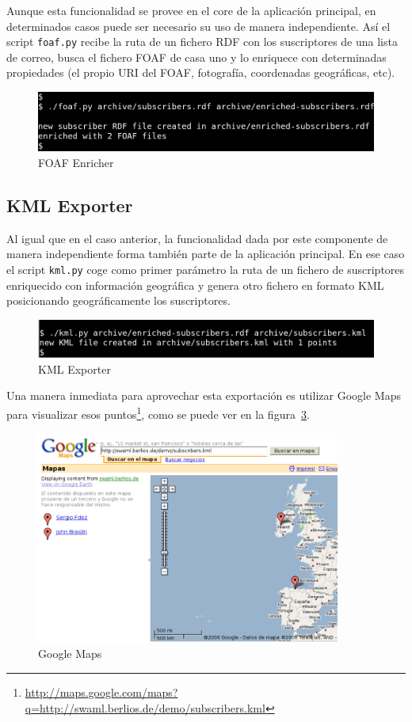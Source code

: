 Aunque esta funcionalidad se provee en el core de la aplicación principal,
en determinados casos puede ser necesario su uso de manera independiente.
Así el script \texttt{foaf.py} recibe la ruta de un fichero RDF con los
suscriptores de una lista de correo, busca el fichero FOAF de casa uno y
lo enriquece con determinadas propiedades (el propio URI del FOAF, fotografía,
coordenadas geográficas, etc).

\begin{figure}[H]
	\centering
	\includegraphics[width=12cm]{images/screenshots/foaf-enricher.png}
	\caption{FOAF Enricher}
	\label{fig:foaf-enricher}
\end{figure}

\subsection*{KML Exporter}

Al igual que en el caso anterior, la funcionalidad dada por este componente
de manera independiente forma también parte de la aplicación principal. En ese
caso el script \texttt{kml.py} coge como primer parámetro la ruta de un fichero
de suscriptores enriquecido con información geográfica y genera otro fichero
en formato KML posicionando geográficamente los suscriptores.

\begin{figure}[H]
	\centering
	\includegraphics[width=12cm]{images/screenshots/kml-exporter.png}
	\caption{KML Exporter}
	\label{fig:kml-exporter}
\end{figure}

Una manera inmediata para aprovechar esta exportación es utilizar Google Maps para visualizar esos
puntos\footnote{\url{http://maps.google.com/maps?q=http://swaml.berlios.de/demo/subscribers.kml}},
como se puede ver en la figura~\ref{fig:googlemaps}.

\begin{figure}[H]
	\centering
	\includegraphics[width=10cm]{images/screenshots/googlemaps.png}
	\caption{Google Maps}
	\label{fig:googlemaps}
\end{figure}

